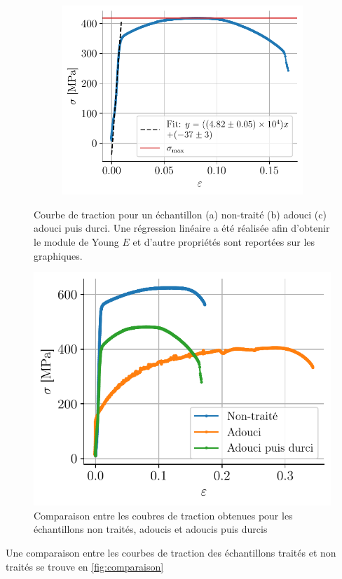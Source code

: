\begin{figure}[h]
\begin{subfigure}{0.48\linewidth}
        \centering
        \includegraphics[width=\linewidth]{figures/tiede6_annotated.pdf}
        \caption{}
        \label{fig:tiede6}
    \end{subfigure}
    \caption{Courbe de traction pour un échantillon (a) non-traité (b) adouci (c) adouci puis durci. Une régression linéaire a été réalisée afin d'obtenir le module de Young \(E\) et d'autre propriétés sont reportées sur les graphiques.}
    \label{<label>}
\end{figure}

\begin{figure}
    \centering
    \includegraphics[width=\linewidth]{figures/comparaison.pdf}
    \caption{Comparaison entre les coubres de traction obtenues pour les échantillons non traités, adoucis et adoucis puis durcis}
\end{figure}
Une comparaison entre les courbes de traction des échantillons traités et non traités se trouve en \autoref{fig:comparaison}

